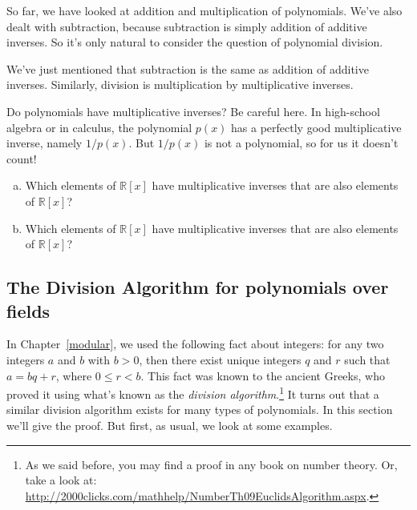 So far, we have looked at addition and multiplication of polynomials. We've also dealt with subtraction, because subtraction is simply addition of additive inverses. So it's only natural to consider the question of polynomial division.

We've just mentioned that subtraction is the same as addition of additive inverses. Similarly, division is multiplication by multiplicative inverses.

Do polynomials have multiplicative inverses? Be careful here. In high-school algebra or in calculus,   the polynomial $p(x)$ has a perfectly good multiplicative inverse, namely  $1/p(x)$. But $1/p(x)$ is not a polynomial, so for us it doesn't count! 

\begin{exercise}{}
\begin{enumerate}[(a)]
\item
Which elements of $\mathbb{R}[x]$ have multiplicative inverses that are also elements of $\mathbb{R}[x]$?
\item
Which elements of $\mathbb{R}[x]$ have multiplicative inverses that are also elements of $\mathbb{R}[x]$?
\end{enumerate}
\end{exercise}

\subsection{The Division Algorithm for polynomials over fields\quad
{}}\label{divisionalgorithm}
In Chapter~\ref{modular}, we used the following fact about integers: for any two integers $a$ and $b$  with $b > 0$, then there exist unique
integers $q$ and $r$ such that $a = bq+r$, where $0 \leq r < b$. This fact was known to the ancient Greeks, who proved it using what's known as the \emph{division algorithm}.\footnote{As we said before, you may find a proof in any book on number theory. Or, take a look at:  \url{http://2000clicks.com/mathhelp/NumberTh09EuclidsAlgorithm.aspx}.} It turns out that a similar
division algorithm exists for many types of
polynomials. In this section we'll  give the proof. But first, as usual, we look at some examples.

